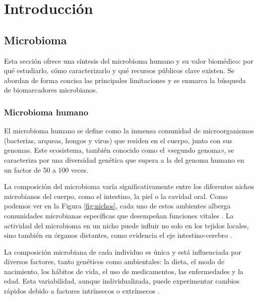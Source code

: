 
\chapter{Introducción}
\label{chap:introduction}


\section{Microbioma}

Esta sección ofrece una síntesis del microbioma humano y su valor biomédico: por qué estudiarlo, cómo caracterizarlo y qué recursos públicos clave existen. Se abordan de forma concisa las principales limitaciones y se enmarca la búsqueda de biomarcadores microbianos.

\subsection{Microbioma humano}

El microbioma humano se define como la inmensa comunidad de microorganismos (bacterias, arqueas, hongos y virus) que residen en el cuerpo, junto con sus genomas. Este ecosistema, también conocido como el «segundo genoma», se caracteriza por una diversidad genética que supera a la del genoma humano en un factor de 50 a 100 veces.

La composición del microbioma varía significativamente entre los diferentes nichos microbianos del cuerpo, como el intestino, la piel o la cavidad oral. Como podemos ver en la Figura \ref{fig:nichos}, cada uno de estos ambientes alberga comunidades microbianas específicas que desempeñan funciones vitales \cite{cho2012human}. La actividad del microbioma en un nicho puede influir no solo en los tejidos locales, sino también en órganos distantes, como evidencia el eje intestino-cerebro \cite{carabotti2015gut}.

La composición microbiana de cada individuo es única y está influenciada por diversos factores, tanto genéticos como ambientales: la dieta, el modo de nacimiento, los hábitos de vida, el uso de medicamentos, las enfermedades y la edad. Esta variabilidad, aunque individualizada, puede experimentar cambios rápidos debido a factores intrínsecos o extrínsecos \cite{bonder2016effect, francino2016antibiotics, hasan2019factors}.

